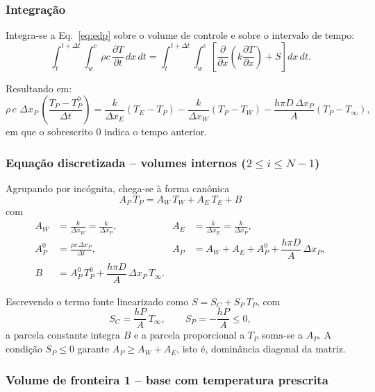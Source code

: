 \subsubsection*{Integra\c{c}\~ao}

Integra-se a Eq.~\eqref{eq:edp} sobre o volume de controle
e sobre o intervalo de tempo:
\[
  \int_{t}^{t+\Delta t}\!\!\int_{w}^{e}
  \rho c\,\frac{\partial T}{\partial t}\,dx\,dt
  =
  \int_{t}^{t+\Delta t}\!\!\int_{w}^{e}
  \left[\frac{\partial}{\partial x}\!\left(k\frac{\partial T}{\partial x}\right)
  +S\right]dx\,dt .
\]

Resultando em:
\[
  \rho\, c\,\,\Delta x_P\,\left(\frac{T_P-T_P^{0}}{\Delta t}\right)
  =\frac{k}{\Delta x_E}\left(T_E-T_P\right)
  -\frac{k}{\Delta x_W}\left(T_P-T_W\right)
  -\frac{h\pi D\,\Delta x_P}{A}\left(T_P-T_\infty\right),
\]
em que o sobrescrito $0$ indica o tempo anterior.

\subsubsection*{Equa\c{c}\~ao discretizada -- volumes internos ($2\le i\le N-1$)}

Agrupando por inc\'ognita, chega-se \`a forma can\^onica
\begin{equation}
  \boxed{\;A_P\,T_P=A_W\,T_W+A_E\,T_E+B\;}
  \label{eq:geral}
\end{equation}
com
\[
\begin{aligned}
  A_W&=\frac{k}{\Delta x_W}=\frac{k}{\Delta x_P}, &
  A_E&=\frac{k}{\Delta x_E}=\frac{k}{\Delta x_P}, \\[4pt]
  A_P^{0}&=\frac{\rho c\,\Delta x_P}{\Delta t}, &
  A_P&=A_W+A_E+A_P^{0}+\dfrac{h\pi D}{A}\,\Delta x_P, \\[4pt]
  B&=A_P^{0}\,T_P^{0}+\dfrac{h\pi D}{A}\,\Delta x_P\,T_\infty . &&
\end{aligned}
\]

Escrevendo o termo fonte linearizado como $S=S_C+S_P\,T_P$, com
\[
  S_C=\frac{hP}{A}\,T_\infty ,\qquad S_P=-\frac{hP}{A}\le 0 ,
\]
a parcela constante integra $B$ e a parcela proporcional a $T_P$ soma-se a
$A_P$. A condi\c{c}\~ao $S_P\le 0$ garante
$A_P\ge A_W+A_E$, isto \'e, domin\^ancia diagonal da matriz.

\subsubsection*{Volume de fronteira 1 -- base com temperatura prescrita}

